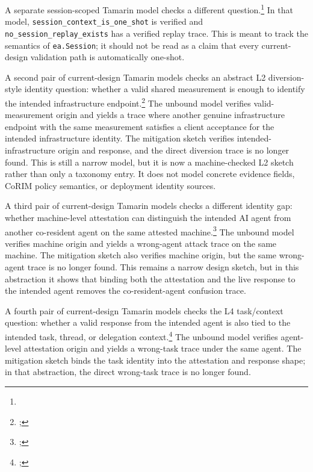 \documentclass[11pt,a4paper]{article}
\begin{document}
A separate session-scoped Tamarin model checks a different
question.\footnote{}
In that model,
\texttt{session\_context\_is\_one\_shot} is verified and
\texttt{no\_session\_replay\_exists} has a verified replay trace. This is meant
to track the semantics of \texttt{ea.Session}; it should not be read as a claim
that every current-design validation path is automatically one-shot.

A second pair of current-design Tamarin models checks an abstract L2
diversion-style identity question: whether a valid shared measurement is enough
to identify the intended infrastructure endpoint.\footnote{;
}
The unbound model verifies valid-measurement origin and yields a trace where
another genuine infrastructure endpoint with the same measurement satisfies a
client acceptance for the intended infrastructure identity. The mitigation
sketch verifies intended-infrastructure origin and response, and the direct
diversion trace is no longer found. This is still a narrow model, but it is
now a machine-checked L2 sketch rather than only a taxonomy entry. It does not
model concrete evidence fields, CoRIM policy semantics, or deployment identity
sources.

A third pair of current-design Tamarin models checks a different identity
gap: whether machine-level attestation can distinguish the intended AI agent
from another co-resident agent on the same attested machine.\footnote{;
}
The unbound model verifies machine origin and yields a wrong-agent attack
trace on the same machine. The mitigation sketch also verifies machine origin,
but the same wrong-agent trace is no longer found. This remains a narrow
design sketch, but in this abstraction it shows that binding both the
attestation and the live response to the intended agent removes the
co-resident-agent confusion trace.

A fourth pair of current-design Tamarin models checks the L4 task/context
question: whether a valid response from the intended agent is also tied to the
intended task, thread, or delegation context.\footnote{;
}
The unbound model verifies agent-level attestation origin and yields a
wrong-task trace under the same agent. The mitigation sketch binds the task
identity into the attestation and response shape; in that abstraction, the
direct wrong-task trace is no longer found.
\end{document}
